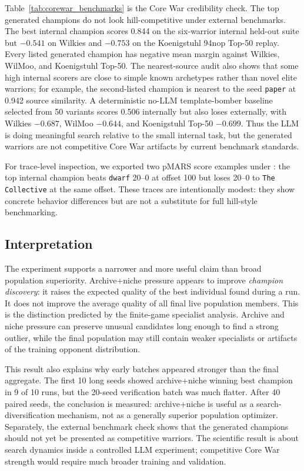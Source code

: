 \documentclass[11pt]{article}
\begin{document}
Table~\ref{tab:corewar_benchmarks} is the Core War credibility check. The top generated champions do not look hill-competitive under external benchmarks. The best internal champion scores 0.844 on the six-warrior internal held-out suite but $-0.541$ on Wilkies and $-0.753$ on the Koenigstuhl 94nop Top-50 replay. Every listed generated champion has negative mean margin against Wilkies, WilMoo, and Koenigstuhl Top-50. The nearest-source audit also shows that some high internal scorers are close to simple known archetypes rather than novel elite warriors; for example, the second-listed champion is nearest to the seed \texttt{paper} at 0.942 source similarity. A deterministic no-LLM template-bomber baseline selected from 50 variants scores 0.506 internally but also loses externally, with Wilkies $-0.687$, WilMoo $-0.644$, and Koenigstuhl Top-50 $-0.699$. Thus the LLM is doing meaningful search relative to the small internal task, but the generated warriors are not competitive Core War artifacts by current benchmark standards.

For trace-level inspection, we exported two pMARS score examples under : the top internal champion beats \texttt{dwarf} 20--0 at offset 100 but loses 20--0 to \texttt{The Collective} at the same offset. These traces are intentionally modest: they show concrete behavior differences but are not a substitute for full hill-style benchmarking.

\subsection{Interpretation}

The experiment supports a narrower and more useful claim than broad population superiority. Archive+niche pressure appears to improve \emph{champion discovery}: it raises the expected quality of the best individual found during a run. It does not improve the average quality of all final live population members. This is the distinction predicted by the finite-game specialist analysis. Archive and niche pressure can preserve unusual candidates long enough to find a strong outlier, while the final population may still contain weaker specialists or artifacts of the training opponent distribution.

This result also explains why early batches appeared stronger than the final aggregate. The first 10 long seeds showed archive+niche winning best champion in 9 of 10 runs, but the 20-seed verification batch was much flatter. After 40 paired seeds, the conclusion is measured: archive+niche is useful as a search-diversification mechanism, not as a generally superior population optimizer. Separately, the external benchmark check shows that the generated champions should not yet be presented as competitive warriors. The scientific result is about search dynamics inside a controlled LLM experiment; competitive Core War strength would require much broader training and validation.
\end{document}
